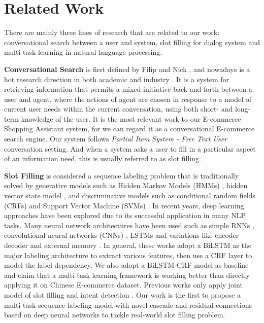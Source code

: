 \section{Related Work}
\label{sec:related}
There are mainly three lines of research that are related to our work:
conversational search between a user and system,
slot filling for dialog system and multi-task learning in natural language processing.

\textbf{Conversational Search} is first defined by Filip and Nick \cite{radlinski2017theoretical},
and nowadays is a hot research direction in both academic and industry \cite{ren2018conversational,yan2017building}.
It is a system for retrieving information that permits a mixed-initiative back
and forth between a user and agent, where the actions of agent are
chosen in response to a model of current user needs within the
current conversation, using both short- and long-term knowledge of the user.
It is the most relevant work to our E-commerce Shopping Assistant system,
for we can regard it as a conversational E-commerce search engine.
Our system follows \emph{Partial Item System - Free Text User} conversation setting.
And when a system asks a user to fill in a particular aspect of an information
need, this is usually referred to as slot filling.

\textbf{Slot Filling} is considered a sequence labeling problem
that is traditionally solved by generative models 
such as Hidden Markov Models (HMMs) \cite{wang2005spoken},
hidden vector state model \cite{he2003data}, 
and discriminative models such as 
conditional random fields (CRFs) \cite{raymond2007generative,lafferty2001conditional} 
and Support Vector Machine (SVMs) \cite{kudo2001chunking}.
In recent years,
deep learning approaches have been explored
due to its successful application in many NLP tasks.
Many neural network architectures have been used such as
simple RNNs \cite{yao2013recurrent,mesnil2015using}, 
convolutional neural networks (CNNs) \cite{xu2013convolutional},
LSTMs \cite{yao2014spoken} 
and variations like encoder-decoder \cite{zhu2017encoder,zhai2017neural} 
and external memory \cite{peng2015recurrent}.
In general, these works adopt a BiLSTM as the major labeling architecture
to extract various features, 
then use a CRF layer \cite{huang2015bidirectional} to model 
the label dependency.
We also adopt a BiLSTM-CRF model as baseline and claim that
a multi-task learning framework is working better than directly 
applying it on Chinese E-commerce dataset.
Previous works
only apply joint model of slot filling and intent detection \cite{zhang2016joint,liu2016joint}.
Our work is the first to propose a multi-task sequence labeling model with novel cascade and residual connections based on 
deep neural networks to tackle real-world slot filling problem.

